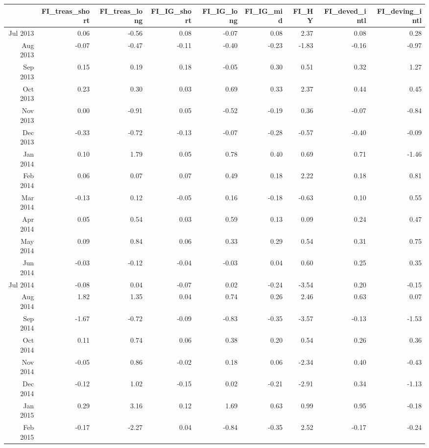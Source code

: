\begin{tabularx}{\textwidth}{rrrrrrrrr}
  \hline
 & FI\_treas\_short & FI\_treas\_long & FI\_IG\_short & FI\_IG\_long & FI\_IG\_mid & FI\_HY & FI\_deved\_intl & FI\_deving\_intl \\ 
  \hline
Jul 2013 & 0.06 & -0.56 & 0.08 & -0.07 & 0.08 & 2.37 & 0.08 & 0.28 \\ 
  Aug 2013 & -0.07 & -0.47 & -0.11 & -0.40 & -0.23 & -1.83 & -0.16 & -0.97 \\ 
  Sep 2013 & 0.15 & 0.19 & 0.18 & -0.05 & 0.30 & 0.51 & 0.32 & 1.27 \\ 
  Oct 2013 & 0.23 & 0.30 & 0.03 & 0.69 & 0.33 & 2.37 & 0.44 & 0.45 \\ 
  Nov 2013 & 0.00 & -0.91 & 0.05 & -0.52 & -0.19 & 0.36 & -0.07 & -0.84 \\ 
  Dec 2013 & -0.33 & -0.72 & -0.13 & -0.07 & -0.28 & -0.57 & -0.40 & -0.09 \\ 
  Jan 2014 & 0.10 & 1.79 & 0.05 & 0.78 & 0.40 & 0.69 & 0.71 & -1.46 \\ 
  Feb 2014 & 0.06 & 0.07 & 0.07 & 0.49 & 0.18 & 2.22 & 0.18 & 0.81 \\ 
  Mar 2014 & -0.13 & 0.12 & -0.05 & 0.16 & -0.18 & -0.63 & 0.10 & 0.55 \\ 
  Apr 2014 & 0.05 & 0.54 & 0.03 & 0.59 & 0.13 & 0.09 & 0.24 & 0.47 \\ 
  May 2014 & 0.09 & 0.84 & 0.06 & 0.33 & 0.29 & 0.54 & 0.31 & 0.75 \\ 
  Jun 2014 & -0.03 & -0.12 & -0.04 & -0.03 & 0.04 & 0.60 & 0.25 & 0.35 \\ 
  Jul 2014 & -0.08 & 0.04 & -0.07 & 0.02 & -0.24 & -3.54 & 0.20 & -0.15 \\ 
  Aug 2014 & 1.82 & 1.35 & 0.04 & 0.74 & 0.26 & 2.46 & 0.63 & 0.07 \\ 
  Sep 2014 & -1.67 & -0.72 & -0.09 & -0.83 & -0.35 & -3.57 & -0.13 & -1.53 \\ 
  Oct 2014 & 0.11 & 0.74 & 0.06 & 0.38 & 0.20 & 0.54 & 0.26 & 0.36 \\ 
  Nov 2014 & -0.05 & 0.86 & -0.02 & 0.18 & 0.06 & -2.34 & 0.40 & -0.43 \\ 
  Dec 2014 & -0.12 & 1.02 & -0.15 & 0.02 & -0.21 & -2.91 & 0.34 & -1.13 \\ 
  Jan 2015 & 0.29 & 3.16 & 0.12 & 1.69 & 0.63 & 0.99 & 0.95 & -0.18 \\ 
  Feb 2015 & -0.17 & -2.27 & 0.04 & -0.84 & -0.35 & 2.52 & -0.17 & -0.24 \\ 

\end{tabularx}
